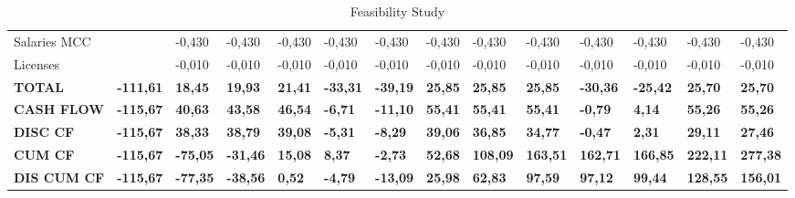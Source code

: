 \begin{landscape}
\begin{table}[]
{\begin{tabular}{| l | l | l | l | l | l | l | l | l | l | l | l | l | l |}
Salaries MCC                                                                           &                  & -0,430          & -0,430          & -0,430          & -0,430          & -0,430          & -0,430          & -0,430          & -0,430          & -0,430          & -0,430           & -0,430           & -0,430           \\
Licenses                                                                               &                  & -0,010          & -0,010          & -0,010          & -0,010          & -0,010          & -0,010          & -0,010          & -0,010          & -0,010          & -0,010           & -0,010           & -0,010           \\
\textbf{TOTAL}                                                                         & \textbf{-111,61} & \textbf{18,45}  & \textbf{19,93}  & \textbf{21,41}  & \textbf{-33,31} & \textbf{-39,19} & \textbf{25,85}  & \textbf{25,85}  & \textbf{25,85}  & \textbf{-30,36} & \textbf{-25,42}  & \textbf{25,70}   & \textbf{25,70}  
\\ \hline \hline
\rowcolor[gray]{0.85}
\textbf{CASH FLOW}                                                                     & \textbf{-115,67} & \textbf{40,63}  & \textbf{43,58}  & \textbf{46,54}  & \textbf{-6,71}  & \textbf{-11,10} & \textbf{55,41}  & \textbf{55,41}  & \textbf{55,41}  & \textbf{-0,79}  & \textbf{4,14}    & \textbf{55,26}   & \textbf{55,26}   \\
\rowcolor[gray]{0.85}
\textbf{DISC CF}                                                                       & \textbf{-115,67} & \textbf{38,33}  & \textbf{38,79}  & \textbf{39,08}  & \textbf{-5,31}  & \textbf{-8,29}  & \textbf{39,06}  & \textbf{36,85}  & \textbf{34,77}  & \textbf{-0,47}  & \textbf{2,31}    & \textbf{29,11}   & \textbf{27,46}   \\
\rowcolor[gray]{0.85}
\textbf{CUM CF}                                                                        & \textbf{-115,67} & \textbf{-75,05} & \textbf{-31,46} & \textbf{15,08}  & \textbf{8,37}   & \textbf{-2,73}  & \textbf{52,68}  & \textbf{108,09} & \textbf{163,51} & \textbf{162,71} & \textbf{166,85}  & \textbf{222,11}  & \textbf{277,38}  \\
\rowcolor[gray]{0.85}
\textbf{DIS CUM CF}                                                                    & \textbf{-115,67} & \textbf{-77,35} & \textbf{-38,56} & \textbf{0,52}   & \textbf{-4,79}  & \textbf{-13,09} & \textbf{25,98}  & \textbf{62,83}  & \textbf{97,59}  & \textbf{97,12}  & \textbf{99,44}   & \textbf{128,55}  & \textbf{156,01} 
\\ \hline
\end{tabular}
}
\vspace*{\fill}
\caption{Feasibility Study}
\label{Feasibility Study}
\end{table}
\end{landscape}